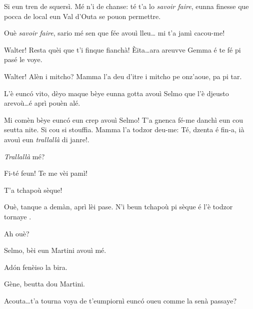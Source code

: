 \begin{drama}

\Genespeaks Si eun tren de squersì. Mé n'i de chanse: té t'a lo \textit{savoir faire}, eunna finesse que pocca de local eun Val d'Outa se pouon permettre.

\Walterspeaks	{} Ouè \textit{savoir faire}, sario mé sen que fée avouì lleu\ldots {} mi t'a jamì cacou-me!

\Dorinaspeaks Walter! Resta quèi que t'i finque fianchà! \`Eita\ldots ara areuvve Gemma é te fé pi pasé le voye.


\Gemmaspeaks{} Walter! Alèn i mitcho? Mamma l'a deu d'itre i mitcho pe onz'aoue, pa pi tar.

\Walterspeaks	L'è eunc\'o vito, dèyo maque  bèye eunna gotta avouì Selmo que l'è djeusto arevoù\ldots é aprì pouèn alé.

\Gemmaspeaks{} Mi comèn bèye eunc\'o eun crep avouì Selmo! T'a gnenca fé-me danchì eun cou seutta nite. Si cou si stouffia. Mamma l'a todzor deu-me: \og Té, dzenta é fin-a, ià avouì eun \textit{trallallà} di janre!\fg.

\Walterspeaks	\textit{Trallallà} mé?

\Gemmaspeaks Fi-té feun! Te me vèi pamì! 


\Selmospeaks{} T'a tchapoù sèque!

\Walterspeaks	Ouè, tanque a demàn, aprì lèi pase. N'i beun tchapoù pi sèque é l'è todzor tornaye	.

\Selmospeaks Ah ouè?

\Walterspeaks{} Selmo, bèi eun Martini avouì mé.

\Selmospeaks Ad\'on fenèiso la bira.

\Walterspeaks{} Gène, beutta dou Martini.

\Genespeaks Acouta\ldots t'a tourna voya de t'eumpiornì eunc\'o oueu comme la senà passaye?


\end{drama}
